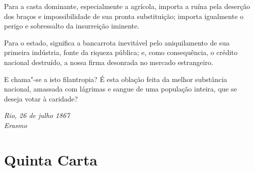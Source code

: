 \begin{linenumbers}
 Para a casta dominante, especialmente a agrícola, importa a ruína pela
deserção dos braços e impossibilidade de sua pronta substituição;
importa igualmente o perigo e sobressalto da insurreição iminente. 

 Para o estado, significa a bancarrota inevitável pelo aniquilamento de
sua primeira indústria, fonte da riqueza pública; e, como consequência,
o crédito nacional destruído, a nossa firma desonrada no mercado estrangeiro.

 E chama"-se a isto filantropia? É esta oblação feita da melhor
substância nacional, amassada com lágrimas e sangue de uma população
inteira, que se deseja votar à caridade?

\end{linenumbers}

\begin{flushright}
\textit{Rio, 26 de julho 1867\\
Erasmo}
\end{flushright} 

\chapter[Quinta Carta]{Quinta Carta }


